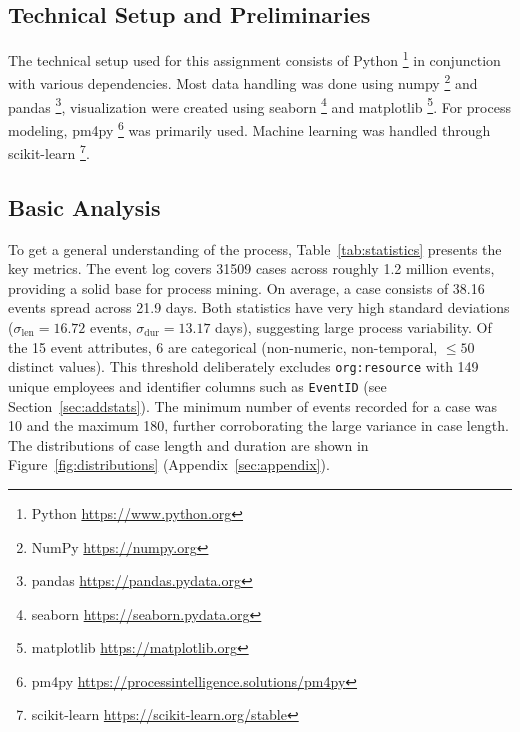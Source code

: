 \documentclass[
  english,        %
  font=times,     %
  twocolumn,      %
]{tumarticle}
\begin{document}
\subsection{Technical Setup and Preliminaries}

The technical setup used for this assignment consists of Python \footnote{\tiny Python \url{https://www.python.org}} in conjunction with various dependencies. Most data handling was done using numpy \footnote{\tiny NumPy \url{https://numpy.org}} and pandas \footnote{\tiny pandas \url{https://pandas.pydata.org}}, visualization were created using seaborn \footnote{\tiny seaborn \url{https://seaborn.pydata.org}} and matplotlib \footnote{\tiny matplotlib \url{https://matplotlib.org}}. For process modeling, pm4py \footnote{\tiny pm4py \url{https://processintelligence.solutions/pm4py}} was primarily used. Machine learning was handled through scikit-learn \footnote{\tiny scikit-learn \url{https://scikit-learn.org/stable}}.


\subsection{Basic Analysis}
To get a general understanding of the process, Table~\ref{tab:statistics} presents the key metrics. The event log covers \num{31509} cases across roughly \num{1.2} million events, providing a solid base for process mining. On average, a case consists of \num{38.16} events spread across \num{21.9} days. Both statistics have very high standard deviations ($\sigma_{\text{len}}=16.72$ events, $\sigma_{\text{dur}}=13.17$ days), suggesting large process variability. Of the \num{15} event attributes, \num{6} are categorical (non-numeric, non-temporal, $\le 50$ distinct values). This threshold deliberately excludes \texttt{org:resource} with \num{149} unique employees and identifier columns such as \texttt{EventID} (see Section~\ref{sec:addstats}). The minimum number of events recorded for a case was \num{10} and the maximum \num{180}, further corroborating the large variance in case length. The distributions of case length and duration are shown in Figure~\ref{fig:distributions} (Appendix~\ref{sec:appendix}).
\end{document}
